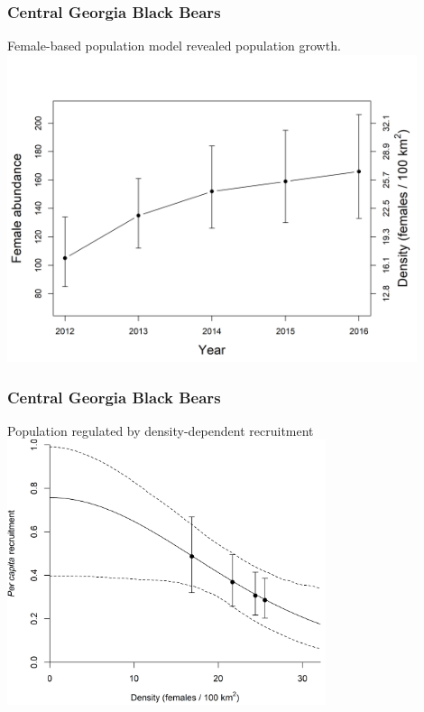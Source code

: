 \documentclass[color=usenames,dvipsnames]{beamer}\usepackage[]{graphicx}\usepackage[]{xcolor}
\begin{document}
\begin{frame}
  \frametitle{Central Georgia Black Bears}
  Female-based population model revealed population
  growth. \\%
  \centering
  \includegraphics[width=0.9\textwidth,trim=0mm 0mm 0mm 10mm,clip]{figs/fig-5_abundance} \\
\end{frame}


\begin{frame}
  \frametitle{Central Georgia Black Bears}
  Population regulated by density-dependent recruitment \\
  \vfill
  \centering
  \includegraphics[width=0.7\textwidth]{figs/fig-3_dd-recruitment} \\
\end{frame}
\end{document}
